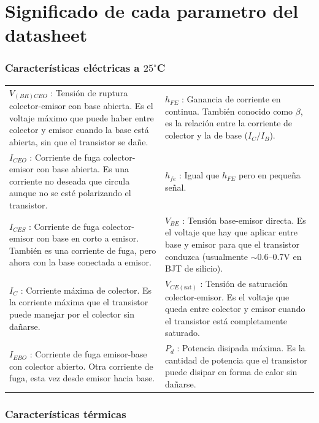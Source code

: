 \documentclass[chaptersright]{informeutn}
\begin{document}
\section{Significado de cada parametro del datasheet}


\subsubsection{Características eléctricas a $25^\circ$C }

\begin{tabular}{p{7cm} p{7cm}}
    $V_{(BR)CEO}$ : Tensión de ruptura colector-emisor con base abierta. Es el voltaje máximo que puede haber entre colector y emisor cuando la base está abierta, sin que el transistor se dañe. &
    $h_{FE}$ : Ganancia de corriente en continua. También conocido como $\beta$, es la relación entre la corriente de colector y la de base ($I_C/I_B$). \\
    
    $I_{CEO}$ : Corriente de fuga colector-emisor con base abierta. Es una corriente no deseada que circula aunque no se esté polarizando el transistor. &
    $h_{fe}$ : Igual que $h_{FE}$ pero en pequeña señal. \\
    
    $I_{CES}$ : Corriente de fuga colector-emisor con base en corto a emisor. También es una corriente de fuga, pero ahora con la base conectada a emisor. &
    $V_{BE}$ : Tensión base-emisor directa. Es el voltaje que hay que aplicar entre base y emisor para que el transistor conduzca (usualmente $\sim$0.6–0.7V en BJT de silicio). \\
    
    $I_C$ : Corriente máxima de colector. Es la corriente máxima que el transistor puede manejar por el colector sin dañarse. &
    $V_{CE(\text{sat})}$ : Tensión de saturación colector-emisor. Es el voltaje que queda entre colector y emisor cuando el transistor está completamente saturado. \\
    
    $I_{EBO}$ : Corriente de fuga emisor-base con colector abierto. Otra corriente de fuga, esta vez desde emisor hacia base. &
    $P_d$ : Potencia disipada máxima. Es la cantidad de potencia que el transistor puede disipar en forma de calor sin dañarse. \\
\end{tabular}

\vspace{1em}
\subsubsection{Características térmicas}
\end{document}
